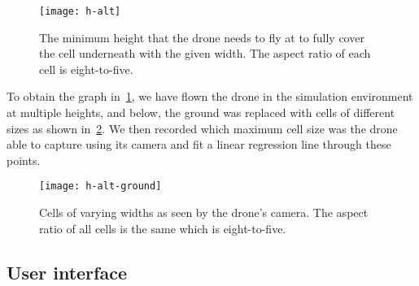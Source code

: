 \documentclass[../main.tex]{subfiles}
\begin{document}
\begin{figure}[tbp]
	\centering
	\texttt{[image: h-alt]}
	\caption{The minimum height that the drone needs to fly at to
        fully cover the cell underneath with the given width.  
        The aspect ratio of each cell is eight-to-five.}
	\label{fig:h-alt}
\end{figure}

To obtain the graph in~\cref{fig:h-alt}, we have flown the drone in
the simulation environment at multiple heights, and below, the ground
was replaced with cells of different sizes as shown
in~\cref{fig:h-alt-ground}.
We then recorded which maximum cell size was the drone able to capture
using its camera and fit a linear regression line through these
points. 

\begin{figure}[tbp]
	\centering
	\texttt{[image: h-alt-ground]}
	\caption{Cells of varying widths as seen by the drone's camera.
        The aspect ratio of all cells is the same which is
        eight-to-five.}
	\label{fig:h-alt-ground}
\end{figure}

\subsection{User interface}

\lipsum[1]
\end{document}
